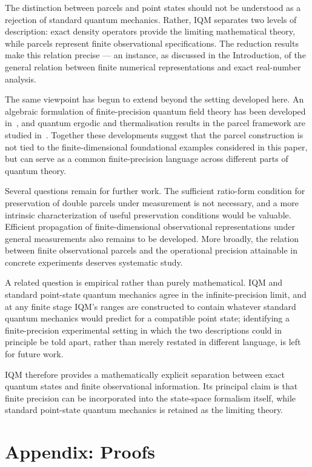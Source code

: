 \documentclass[11pt, onecolumn]{article}
\begin{document}
The distinction between parcels and point states should not be understood as
a rejection of standard quantum mechanics. Rather, IQM separates two levels
of description: exact density operators provide the limiting mathematical
theory, while parcels represent finite observational specifications. The
reduction results make this relation precise — an instance, as discussed in
the Introduction, of the general relation between finite numerical
representations and exact real-number analysis.

The same viewpoint has begun to extend beyond the setting developed here.
An algebraic formulation of finite-precision quantum field theory has been
developed in~\cite{EdalatIAQFT2026}, and quantum ergodic and thermalisation
results in the parcel framework are studied in~\cite{EdalatErgodicity2026}.
Together these
developments suggest that the parcel construction is not tied to the
finite-dimensional foundational examples considered in this paper, but can
serve as a common finite-precision language across different parts of quantum
theory.

Several questions remain for further work. The sufficient ratio-form condition for
preservation of double parcels under measurement is not necessary, and a
more intrinsic characterization of useful preservation conditions would be
valuable. Efficient propagation of finite-dimensional observational
representations under general measurements also remains to be developed.
More broadly, the relation between finite observational parcels and the
operational precision attainable in concrete experiments deserves systematic
study.

A related question is empirical rather than purely mathematical. IQM and
standard point-state quantum mechanics agree in the infinite-precision
limit, and at any finite stage IQM's ranges are constructed to contain
whatever standard quantum mechanics would predict for a compatible point
state; identifying a finite-precision experimental setting in which the two
descriptions could in principle be told apart, rather than merely restated
in different language, is left for future work.

IQM therefore provides a mathematically explicit separation between exact
quantum states and finite observational information. Its principal claim is
that finite precision can be incorporated into the
state-space formalism itself, while standard point-state quantum mechanics
is retained as the limiting theory.

\section*{Appendix: Proofs}
\end{document}
